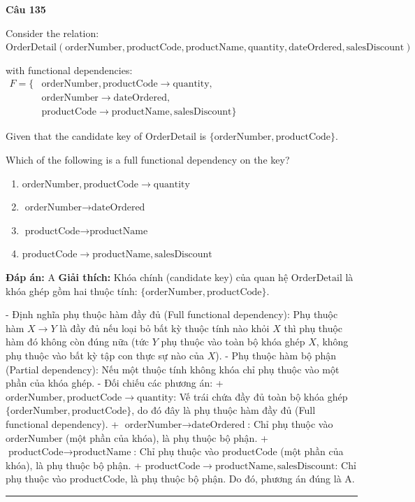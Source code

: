 \documentclass[11pt,a4paper]{article}
\newenvironment{question}[1]{%
  \par\vspace{1em}\noindent\textbf{\large Câu #1}\par\vspace{0.4em}
}{%
  \par\vspace{1em}\hrule\vspace{0.6em}
}
\newenvironment{choices}{%
  \begin{enumerate}[label=\textbf{\Alph*.},leftmargin=2.2em,itemsep=2pt,topsep=3pt]
}{%
  \end{enumerate}
}
\newcommand{\choice}{\item}
\begin{document}
\begin{question}{135}
Consider the relation:
\(\text{OrderDetail}(\text{orderNumber}, \text{productCode}, \text{productName}, \text{quantity}, \text{dateOrdered}, \text{salesDiscount})\)

with functional dependencies:
\(\begin{aligned}
F = \{ &\text{orderNumber}, \text{productCode} \rightarrow \text{quantity}, \\
       &\text{orderNumber} \rightarrow \text{dateOrdered}, \\
       &\text{productCode} \rightarrow \text{productName}, \text{salesDiscount} \}
\end{aligned}\)

Given that the candidate key of \(\text{OrderDetail}\) is \(\{\text{orderNumber}, \text{productCode}\}\).

Which of the following is a full functional dependency on the key?
\begin{choices}
\choice \(\text{orderNumber}, \text{productCode} \rightarrow \text{quantity}\)
\choice \(\text{orderNumber} \rightarrow \text{dateOrdered}\)
\choice \(\text{productCode} \rightarrow \text{productName}\)
\choice \(\text{productCode} \rightarrow \text{productName}, \text{salesDiscount}\)
\end{choices}
\textbf{Đáp án:} A
\textbf{Giải thích:} Khóa chính (candidate key) của quan hệ \(\text{OrderDetail}\) là khóa ghép gồm hai thuộc tính: \(\{\text{orderNumber}, \text{productCode}\}\).

- Định nghĩa phụ thuộc hàm đầy đủ (Full functional dependency): Phụ thuộc hàm \(X \rightarrow Y\) là đầy đủ nếu loại bỏ bất kỳ thuộc tính nào khỏi \(X\) thì phụ thuộc hàm đó không còn đúng nữa (tức \(Y\) phụ thuộc vào toàn bộ khóa ghép \(X\), không phụ thuộc vào bất kỳ tập con thực sự nào của \(X\)).
- Phụ thuộc hàm bộ phận (Partial dependency): Nếu một thuộc tính không khóa chỉ phụ thuộc vào một phần của khóa ghép.
- Đối chiếu các phương án:
  + \(\text{orderNumber}, \text{productCode} \rightarrow \text{quantity}\): Vế trái chứa đầy đủ toàn bộ khóa ghép \(\{\text{orderNumber}, \text{productCode}\}\), do đó đây là phụ thuộc hàm đầy đủ (Full functional dependency).
  + \(\text{orderNumber} \rightarrow \text{dateOrdered}\): Chỉ phụ thuộc vào \(\text{orderNumber}\) (một phần của khóa), là phụ thuộc bộ phận.
  + \(\text{productCode} \rightarrow \text{productName}\): Chỉ phụ thuộc vào \(\text{productCode}\) (một phần của khóa), là phụ thuộc bộ phận.
  + \(\text{productCode} \rightarrow \text{productName}, \text{salesDiscount}\): Chỉ phụ thuộc vào \(\text{productCode}\), là phụ thuộc bộ phận.
Do đó, phương án đúng là A.
\end{question}
\end{document}
